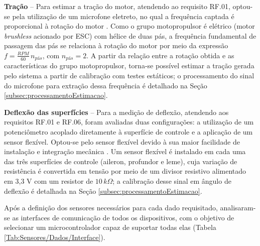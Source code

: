 \textbf{Tração} – Para estimar a tração do motor, atendendo ao requisito RF.01, optou-se pela utilização de um microfone eletreto, no qual a frequência captada é proporcional à rotação do motor \cite{Fosalau2022}. Como o grupo motopropulsor é elétrico (motor \textit{brushless} acionado por ESC) com hélice de duas pás, a frequência fundamental de passagem das pás se relaciona à rotação do motor por meio da expressão $f = \frac{RPM}{60}\,n_{pás}$, com $n_{pás}=2$. A partir da relação entre a rotação obtida e as características do grupo motopropulsor, torna-se possível estimar a tração gerada pelo sistema a partir de calibração com testes estáticos; o processamento do sinal do microfone para extração dessa frequência é detalhado na Seção \ref{subsec:processamentoEstimacao}.

\textbf{Deflexão das superfícies} – Para a medição de deflexão, atendendo aos requisitos RF.01 e RF.06, foram avaliadas duas configurações: a utilização de um potenciômetro acoplado diretamente à superfície de controle e a aplicação de um sensor flexível. Optou-se pelo sensor flexível devido à sua maior facilidade de instalação e integração mecânica \cite{KarinaAssini}. Um sensor flexível é instalado em cada uma das três superfícies de controle (aileron, profundor e leme), cuja variação de resistência é convertida em tensão por meio de um divisor resistivo alimentado em 3,3 V com um resistor de $10\,k\Omega$; a calibração desse sinal em ângulo de deflexão é detalhada na Seção \ref{subsec:processamentoEstimacao}.

Após a definição dos sensores necessários para cada dado requisitado, analisaram-se as interfaces de comunicação de todos os dispositivos, com o objetivo de selecionar um microcontrolador capaz de suportar todas elas (Tabela \ref{Tab:Sensores/Dados/Interface}).

